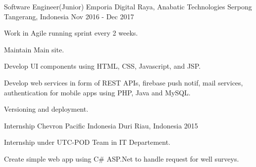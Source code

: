 \begin{cventries}
\cventry
    {Software Engineer(Junior)}
    {Emporia Digital Raya, Anabatic Technologies}
    {Serpong Tangerang, Indonesia}
    {Nov 2016 - Dec 2017}
    {
        \begin{cvitems}
            \item {Work in Agile running sprint every 2 weeks.}
            \item {Maintain Main site.}
            \item {Develop UI components using HTML, CSS, Javascript, and JSP.}
            \item {Develop web services in form of REST APIs, firebase push notif, mail services, authentication for mobile apps using PHP, Java and MySQL.}
            \item {Versioning and deployment.}
        \end{cvitems}
    }

\cventry
    {Internship}
    {Chevron Pacific Indonesia}
    {Duri Riau, Indonesia}
    {2015}
    {
        \begin{cvitems}
            \item {Internship under UTC-POD Team in IT Departement.}
            \item {Create simple web app using C\# ASP.Net to handle request for well surveys.}
        \end{cvitems}
    }

\end{cventries}
